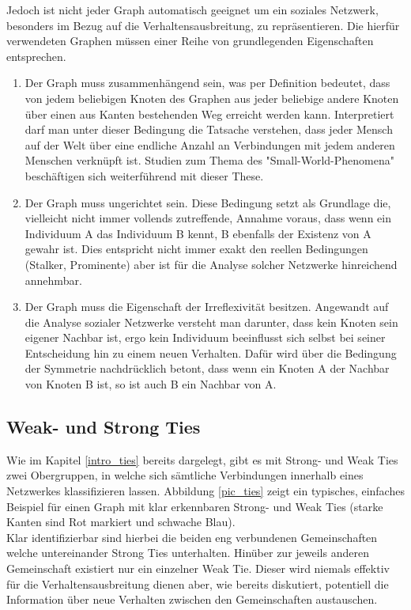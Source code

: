 \documentclass[12pt]{article}
\begin{document}
Jedoch ist nicht jeder Graph automatisch geeignet um ein soziales Netzwerk, besonders im Bezug auf die Verhaltensausbreitung, zu repräsentieren. Die hierfür verwendeten Graphen müssen einer Reihe von grundlegenden Eigenschaften entsprechen.
\begin{enumerate}
\label{enum_graphConditions}
\item Der Graph muss zusammenhängend sein, was per Definition bedeutet, dass von jedem beliebigen Knoten des Graphen aus jeder beliebige andere Knoten über einen aus Kanten bestehenden Weg erreicht werden kann. Interpretiert darf man unter dieser Bedingung die Tatsache verstehen, dass jeder Mensch auf der Welt über eine endliche Anzahl an Verbindungen mit jedem anderen Menschen verknüpft ist. Studien zum Thema des "Small-World-Phenomena" beschäftigen sich weiterführend mit dieser These.
\item Der Graph muss ungerichtet sein. Diese Bedingung setzt als Grundlage die, vielleicht nicht immer vollends zutreffende, Annahme voraus, dass wenn ein Individuum A das Individuum B kennt, B ebenfalls der Existenz von A gewahr ist. Dies entspricht nicht immer exakt den reellen Bedingungen (Stalker, Prominente) aber ist für die Analyse solcher Netzwerke hinreichend annehmbar.
\item Der Graph muss die Eigenschaft der Irreflexivität besitzen. Angewandt auf die Analyse sozialer Netzwerke versteht man darunter, dass kein Knoten sein eigener Nachbar ist, ergo kein Individuum beeinflusst sich selbst bei seiner Entscheidung hin zu einem neuen Verhalten. Dafür wird über die Bedingung der Symmetrie nachdrücklich betont, dass wenn ein Knoten A der Nachbar von Knoten B ist, so ist auch B ein Nachbar von A.
\end{enumerate}


\subsection{Weak- und Strong Ties}
Wie im Kapitel \ref{intro_ties} bereits dargelegt, gibt es mit Strong- und Weak Ties zwei Obergruppen, in welche sich sämtliche Verbindungen innerhalb eines Netzwerkes klassifizieren lassen. Abbildung \ref{pic_ties} zeigt ein typisches, einfaches Beispiel für einen Graph mit klar erkennbaren Strong- und Weak Ties (starke Kanten sind Rot markiert und schwache Blau).\\
Klar identifizierbar sind hierbei die beiden eng verbundenen Gemeinschaften welche untereinander Strong Ties unterhalten. Hinüber zur jeweils anderen Gemeinschaft existiert nur ein einzelner Weak Tie. Dieser wird niemals effektiv für die Verhaltensausbreitung dienen aber, wie bereits diskutiert, potentiell die Information über neue Verhalten zwischen den Gemeinschaften austauschen.
\end{document}
